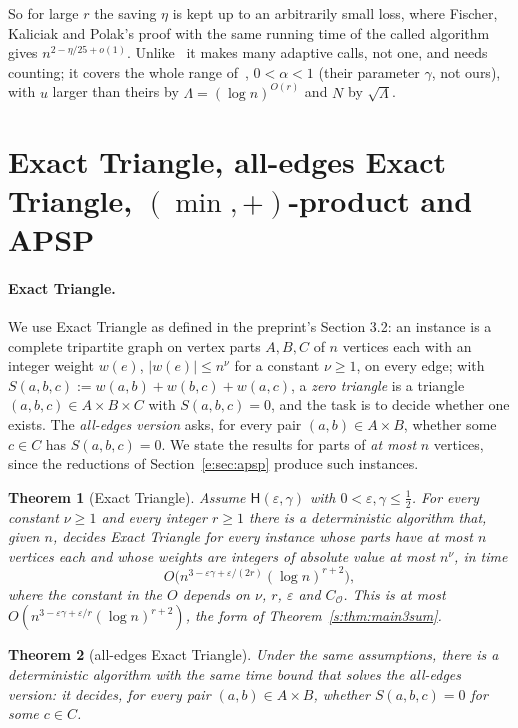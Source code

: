 \documentclass[11pt]{article}
\newtheorem{theorem}{Theorem}[section]
\theoremstyle{definition}
\theoremstyle{remark}
\newcommand{\Hyp}{\mathsf{H}}
\begin{document}
So for large $r$ the saving $\eta$ is kept up to an arbitrarily small loss, where Fischer, Kaliciak and Polak's proof with the same running time of the called algorithm gives $n^{2-\eta/25+o(1)}$. Unlike~\cite{KPP16,FKP24} it makes many adaptive calls, not one, and needs counting; it covers the whole range of~\cite{KPP16}, $0<\alpha<1$ (their parameter $\gamma$, not ours), with $u$ larger than theirs by $\Lambda=(\log n)^{O(r)}$ and $N$ by $\sqrt\Lambda$.

\section{Exact Triangle, all-edges Exact Triangle, \texorpdfstring{$(\min,+)$}{(min,+)}-product and APSP}\label{e:sec:statement}

\paragraph{Exact Triangle.} We use Exact Triangle as defined in the preprint's Section 3.2: an instance is a complete tripartite graph on vertex parts $A,B,C$ of $n$ vertices each with an integer weight $w(e)$, $|w(e)|\le n^\nu$ for a constant $\nu\ge1$, on every edge; with $S(a,b,c):=w(a,b)+w(b,c)+w(a,c)$, a \emph{zero triangle} is a triangle $(a,b,c)\in A\times B\times C$ with $S(a,b,c)=0$, and the task is to decide whether one exists.
The \emph{all-edges version} asks, for every pair $(a,b)\in A\times B$, whether some $c\in C$ has $S(a,b,c)=0$. We state the results for parts of \emph{at most} $n$ vertices, since the reductions of Section~\ref{e:sec:apsp} produce such instances.

\begin{theorem}[Exact Triangle]\label{e:thm:A}
Assume $\Hyp(\varepsilon,\gamma)$ with $0<\varepsilon,\gamma\le\frac12$. For every constant $\nu\ge1$ and every integer $r\ge1$ there is a deterministic algorithm that, given $n$, decides Exact Triangle for every instance whose parts have at most $n$ vertices each and whose weights are integers of absolute value at most $n^\nu$, in time
\[
O\big(n^{3-\varepsilon\gamma+\varepsilon/(2r)}(\log n)^{r+2}\big),
\]
where the constant in the $O$ depends on $\nu$, $r$, $\varepsilon$ and $C_{\mathcal O}$. This is at most $O(n^{3-\varepsilon\gamma+\varepsilon/r}(\log n)^{r+2})$, the form of Theorem~\ref{s:thm:main3sum}.
\end{theorem}

\begin{theorem}[all-edges Exact Triangle]\label{e:thm:B}
Under the same assumptions, there is a deterministic algorithm with the same time bound that solves the all-edges version: it decides, for every pair $(a,b)\in A\times B$, whether $S(a,b,c)=0$ for some $c\in C$.
\end{theorem}
\end{document}
